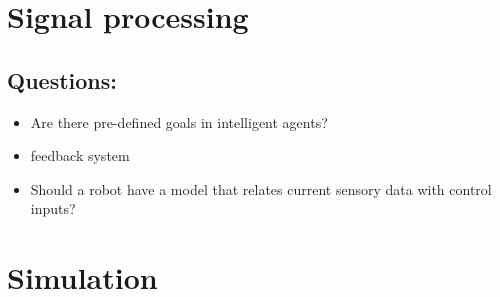 \section{Signal processing}
    \subsection{Questions:}
        \begin{itemize}
            \item Are there pre-defined goals in intelligent agents?
            \item feedback system
            \item Should a robot have a model that relates current sensory data with control inputs?
        \end{itemize}
\section{Simulation}
    
